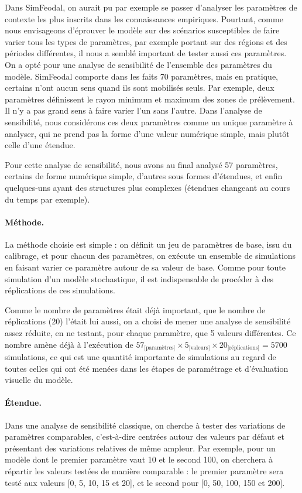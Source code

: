 Dans SimFeodal, on aurait pu par exemple se passer d'analyser les paramètres de contexte les plus inscrits dans les connaissances empiriques.
Pourtant, comme nous envisageons d'éprouver le modèle sur des scénarios susceptibles de faire varier tous les types de paramètres, par exemple portant sur des régions et des périodes différentes, il nous a semblé important de tester aussi ces paramètres.
On a opté pour une analyse de sensibilité de l'ensemble des paramètres du modèle.
SimFeodal comporte dans les faits 70 paramètres, mais en pratique, certains n'ont aucun sens quand ils sont mobilisés seuls.
Par exemple, deux paramètres définissent le rayon minimum et maximum des zones de prélèvement.
Il n'y a pas grand sens à faire varier l'un sans l'autre.
Dans l'analyse de sensibilité, nous considérons ces deux paramètres comme un unique paramètre à analyser, qui ne prend pas la forme d'une valeur numérique simple, mais plutôt celle d'une étendue.

Pour cette analyse de sensibilité, nous avons au final analysé 57 \og paramètres\fg{}, certains de forme numérique simple, d'autres sous formes d'étendues, et enfin quelques-uns ayant des structures plus complexes (étendues changeant au cours du temps par exemple).

\paragraph{Méthode.}
La méthode choisie est simple : on définit un jeu de paramètres de base, issu du calibrage, et pour chacun des paramètres, on exécute un ensemble de simulations en faisant varier ce paramètre autour de sa valeur de base.
Comme pour toute simulation d'un modèle stochastique, il est indispensable de procéder à des réplications de ces simulations.

Comme le nombre de paramètres était déjà important, que le nombre de réplications (20) l'était lui aussi, on a choisi de mener une analyse de sensibilité assez réduite, en ne testant, pour chaque paramètre, que 5 valeurs différentes.
Ce nombre amène déjà à l'exécution de $57_{\text{[paramètres]}} \times 5_{\text{[valeurs]}} \times 20_{\text{[réplications]}} = 5700$ simulations, ce qui est une quantité importante de simulations au regard de toutes celles qui ont été menées dans les étapes de paramétrage et d'évaluation visuelle du modèle.

\paragraph{Étendue.}\label{par:etendue-parametres}
Dans une analyse de sensibilité classique, on cherche à tester des variations de paramètres comparables, c'est-à-dire centrées autour des valeurs par défaut et présentant des variations relatives de même ampleur.
Par exemple, pour un modèle dont le premier paramètre vaut 10 et le second 100, on cherchera à répartir les valeurs testées de manière comparable : 
le premier paramètre sera testé aux valeurs [0, 5, 10, 15 et 20], et le second pour [0, 50, 100, 150 et 200].

